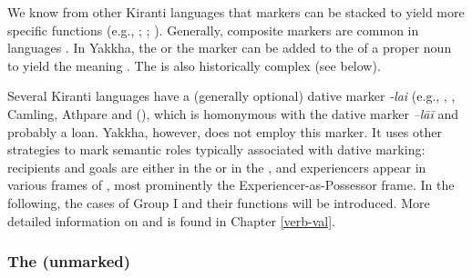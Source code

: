We know from other Kiranti languages that  markers can be stacked to yield more specific functions (e.g., \citealt[81]{Ebert1994The-structure}; \citealt[6]{Dirksmeyer2008Spatial}; \citealt[26]{Schikowski2013_Thesis}). Generally, composite  markers are common in  languages \citep[60]{DeLancey1985_Etymological}. In Yakkha, the  or the   marker can be added to the  of a proper noun to yield the meaning . The  is also historically complex (see  below).

Several Kiranti languages have a (generally optional) dative marker \emph{-lai} (e.g.,  \citep{Doornenbal2009A-grammar},  \citep{Bickeletal2007Two-ways}, Camling, Athpare and  (\citealt{Ebert1994The-structure}), which is homonymous with the  dative marker \emph{–lāī} and probably a loan. Yakkha, however, does not employ this marker. It uses other strategies to mark semantic roles typically associated with  dative marking: recipients and goals are either in the  or in the , and experiencers appear in various frames of , most prominently the Experiencer-as-Possessor frame.
In the following, the cases of Group I and their functions will be introduced. More detailed information on  and  is found in Chapter \ref{verb-val}.

\subsubsection{The  (unmarked)}\label{case-nom}

